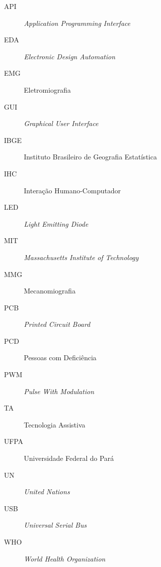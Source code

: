 \begin{description}
	\item[API]   \emph{Application Programming Interface}
	\item[EDA]   \emph{Electronic Design Automation}
	\item[EMG]   Eletromiografia
	\item[GUI]   \emph{Graphical User Interface}
	\item[IBGE]  Instituto Brasileiro de Geografia Estat\'istica
	\item[IHC]   Interação Humano-Computador
	\item[LED]   \emph{Light Emitting Diode}
	\item[MIT]   \emph{Massachusetts Institute of Technology}
	\item[MMG]   Mecanomiografia
	\item[PCB]   \emph{Printed Circuit Board}
	\item[PCD]   Pessoas com Deficiência
	\item[PWM]   \emph{Pulse With Modulation}
	\item[TA]    Tecnologia Assistiva
	\item[UFPA]  Universidade Federal do Pará
	\item[UN]    \emph{United Nations}
	\item[USB]   \emph{Universal Serial Bus}
	\item[WHO]   \emph{World Health Organization} 
\end{description}
